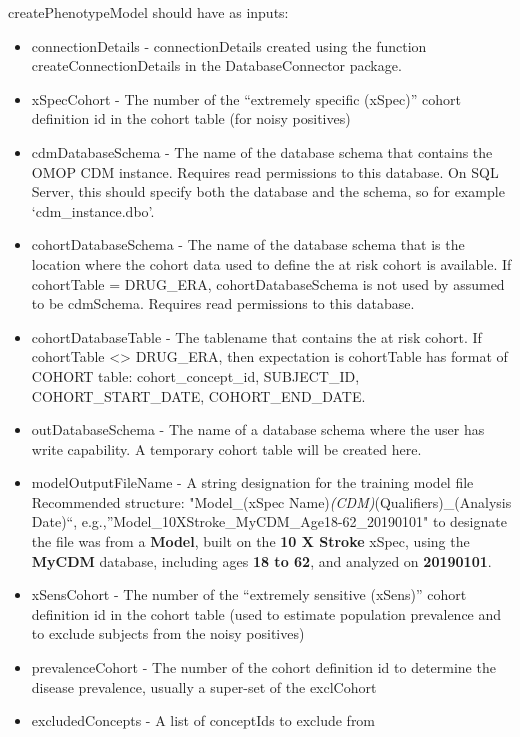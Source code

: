 \documentclass[]{article}
\providecommand{\tightlist}{%
  \setlength{\itemsep}{0pt}\setlength{\parskip}{0pt}}
\begin{document}
createPhenotypeModel should have as inputs:

\begin{itemize}
\tightlist
\item
  connectionDetails - connectionDetails created using the function
  createConnectionDetails in the DatabaseConnector package.
\item
  xSpecCohort - The number of the ``extremely specific (xSpec)'' cohort
  definition id in the cohort table (for noisy positives)
\item
  cdmDatabaseSchema - The name of the database schema that contains the
  OMOP CDM instance. Requires read permissions to this database. On SQL
  Server, this should specify both the database and the schema, so for
  example `cdm\_instance.dbo'.
\item
  cohortDatabaseSchema - The name of the database schema that is the
  location where the cohort data used to define the at risk cohort is
  available. If cohortTable = DRUG\_ERA, cohortDatabaseSchema is not
  used by assumed to be cdmSchema. Requires read permissions to this
  database.
\item
  cohortDatabaseTable - The tablename that contains the at risk cohort.
  If cohortTable \textless{}\textgreater{} DRUG\_ERA, then expectation
  is cohortTable has format of COHORT table: cohort\_concept\_id,
  SUBJECT\_ID, COHORT\_START\_DATE, COHORT\_END\_DATE.
\item
  outDatabaseSchema - The name of a database schema where the user has
  write capability. A temporary cohort table will be created here.
\item
  modelOutputFileName - A string designation for the training model file
  Recommended structure: "Model\_(xSpec
  Name)\emph{(CDM)}(Qualifiers)\_(Analysis Date)``,
  e.g.,''Model\_10XStroke\_MyCDM\_Age18-62\_20190101" to designate the
  file was from a \textbf{Model}, built on the \textbf{10 X Stroke}
  xSpec, using the \textbf{MyCDM} database, including ages \textbf{18 to
  62}, and analyzed on \textbf{20190101}.
\item
  xSensCohort - The number of the ``extremely sensitive (xSens)'' cohort
  definition id in the cohort table (used to estimate population
  prevalence and to exclude subjects from the noisy positives)
\item
  prevalenceCohort - The number of the cohort definition id to determine
  the disease prevalence, usually a super-set of the exclCohort
\item
  excludedConcepts - A list of conceptIds to exclude from

\end{itemize}
\end{document}
